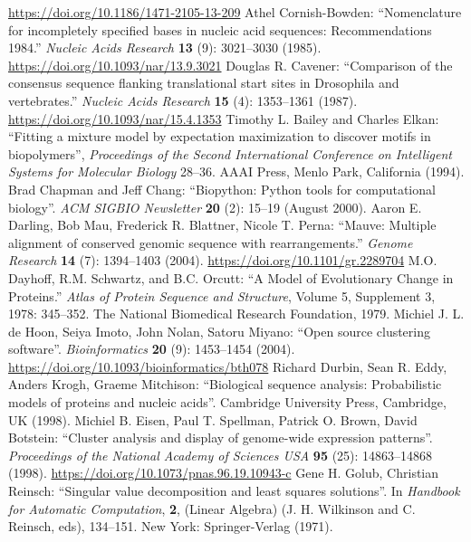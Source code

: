 \documentclass{report}
\begin{document}
\begin{thebibliography}{99}
\url{https://doi.org/10.1186/1471-2105-13-209}
Athel Cornish-Bowden: ``Nomenclature for incompletely specified bases in nucleic acid sequences: Recommendations 1984.'' \textit{Nucleic Acids Research} {\bf 13} (9): 3021--3030 (1985).
\url{https://doi.org/10.1093/nar/13.9.3021}
Douglas R. Cavener: ``Comparison of the consensus sequence flanking translational start sites in Drosophila and vertebrates.'' \textit{Nucleic Acids Research} {\bf 15} (4): 1353--1361 (1987).
\url{https://doi.org/10.1093/nar/15.4.1353}
Timothy L. Bailey and Charles Elkan: ``Fitting a mixture model by expectation maximization to discover motifs in biopolymers'', \textit{Proceedings of the Second International Conference on Intelligent Systems for Molecular Biology} 28--36. AAAI Press, Menlo Park, California (1994).
Brad Chapman and Jeff Chang: ``Biopython: Python tools for computational biology''. \textit{ACM SIGBIO Newsletter} {\bf 20} (2): 15--19 (August 2000).
Aaron E. Darling, Bob Mau, Frederick R. Blattner, Nicole T. Perna: ``Mauve: Multiple alignment of conserved genomic sequence with rearrangements.'' \textit{Genome Research} {\bf 14} (7): 1394--1403 (2004).
\url{https://doi.org/10.1101/gr.2289704}
M.O. Dayhoff, R.M. Schwartz, and B.C. Orcutt: ``A Model of Evolutionary Change in Proteins.'' \textit{Atlas of Protein Sequence and Structure}, Volume 5, Supplement 3, 1978: 345--352. The National Biomedical Research Foundation, 1979.
Michiel J. L. de Hoon, Seiya Imoto, John Nolan, Satoru Miyano: ``Open source clustering software''. \textit{Bioinformatics} {\bf 20} (9): 1453--1454 (2004).
\url{https://doi.org/10.1093/bioinformatics/bth078}
Richard Durbin, Sean R. Eddy, Anders Krogh, Graeme Mitchison:
``Biological sequence analysis: Probabilistic models of proteins and nucleic acids''.
Cambridge University Press, Cambridge, UK (1998).
Michiel B. Eisen, Paul T. Spellman, Patrick O. Brown, David Botstein: ``Cluster analysis and display of genome-wide expression patterns''. \textit{Proceedings of the National Academy of Sciences USA} {\bf 95} (25): 14863--14868 (1998). \url{https://doi.org/10.1073/pnas.96.19.10943-c}
Gene H. Golub, Christian Reinsch: ``Singular value decomposition and least squares solutions''. In \textit{Handbook for Automatic Computation}, {\bf 2}, (Linear Algebra) (J. H. Wilkinson and C. Reinsch, eds), 134--151. New York: Springer-Verlag (1971).

\end{thebibliography}
\end{document}
